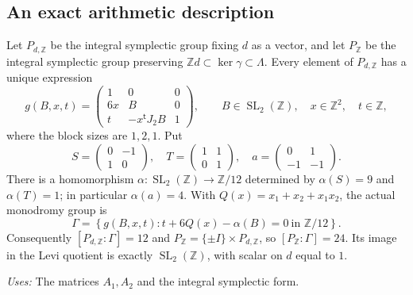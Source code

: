 \subsection{An exact arithmetic description}
\begin{theorem}[FAM F.1.1; T]\label{fam:F.1.1}
Let $P_{d,\mathbb Z}$ be the integral symplectic group fixing $d$ as a
vector, and let $P_{\mathbb Z}$ be the integral symplectic group preserving
$\mathbb Zd\subset\ker\gamma\subset\Lambda$.  Every element of
$P_{d,\mathbb Z}$ has a unique expression
\begin{equation}\label{fam:eq:F-g}
 g(B,x,t)=
 \begin{pmatrix}
 1&0&0\\6x&B&0\\t&-x^{\mathsf t}J_2B&1
 \end{pmatrix},\qquad
 B\in\operatorname{SL}_2(\mathbb Z),\quad x\in\mathbb Z^2,\quad t\in\mathbb Z,
\end{equation}
where the block sizes are $1,2,1$.  Put
\[
 S=\begin{pmatrix}0&-1\\1&0\end{pmatrix},\quad
 T=\begin{pmatrix}1&1\\0&1\end{pmatrix},\quad
 a=\begin{pmatrix}0&1\\-1&-1\end{pmatrix}.
\]
There is a homomorphism
$\alpha:\operatorname{SL}_2(\mathbb Z)\to\mathbb Z/12$ determined by
$\alpha(S)=9$ and $\alpha(T)=1$; in particular $\alpha(a)=4$.
With $Q(x)=x_1+x_2+x_1x_2$, the actual monodromy group is
\begin{equation}\label{fam:eq:F-Gamma}
 \Gamma=\left\{g(B,x,t):t+6Q(x)-\alpha(B)=0\ \text{in }\mathbb Z/12\right\}.
\end{equation}
Consequently $[P_{d,\mathbb Z}:\Gamma]=12$ and
$P_{\mathbb Z}=\{\pm I\}\times P_{d,\mathbb Z}$, so
$[P_{\mathbb Z}:\Gamma]=24$.  Its image in the Levi quotient is exactly
$\operatorname{SL}_2(\mathbb Z)$, with scalar on $d$ equal to $1$.
\end{theorem}
\noindent\emph{Uses:} The matrices $A_1,A_2$ and the integral symplectic form.\par

